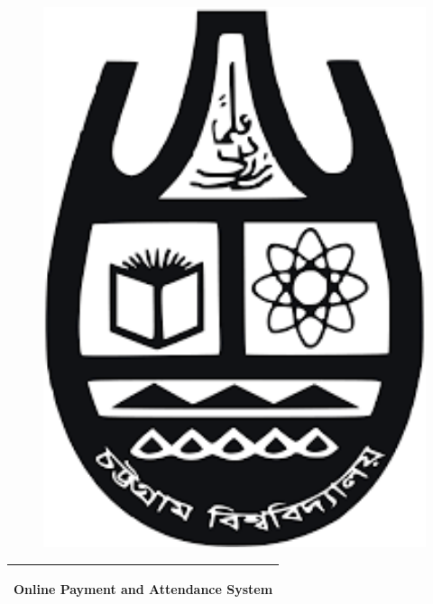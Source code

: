 \begin{titlepage}

\begin{figure}
	\centering
	\begin{minipage}[b]{0.15\textwidth}
		\includegraphics[width=1\textwidth]{images/cu}
	\end{minipage} \hfill
	\end{figure}
	
\noindent%
  \begin{tabular}{@{}p{\textwidth}@{}}
    \hline
    \hline
    \vspace{0.2cm}
    \begin{center}
    \Huge{\textbf{
      Online Payment and Attendance System %
    }}
    \end{center}
    \vspace{0.2cm}\\
    \hline
    \hline
  \end{tabular}
  \vspace{4 cm}


\end{titlepage}
